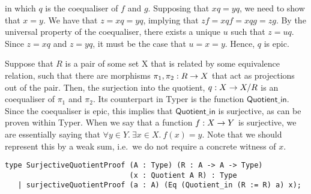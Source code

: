 \documentclass[12pt,twoside,maitrise]{dms}
\theoremstyle{definition}
\numberwithin{equation}{section}
\numberwithin{table}{chapter}
\numberwithin{figure}{chapter}
\newcommand\kw[1] {\textsf{#1}}
\begin{document}
\begin{figure}[H]
\end{figure}

in which $q$ is the coequaliser of $f$ and $g$. Supposing that $xq = yq$, we need to show that $x = y$. We have that $z = xq = yq$, implying that $zf = xqf = xqg = zg$. By the universal property of the coequaliser, there exists a unique $u$ such that $z = uq$. Since $z = xq$ and $z = yq$, it must be the case that $u = x = y$. Hence, $q$ is epic.

Suppose that $R$ is a pair of some set X that is related by some equivalence
relation, such that there are morphisms $\oftype{\pi_1, \pi_2}{R \rightarrow X}$
that act as projections out of the pair. Then, the surjection into the quotient,
$\oftype{q}{X \rightarrow X/R}$ is an coequaliser of $\pi_1$ and $\pi_2$. Its
counterpart in Typer is the function $\kw{Quotient\_in}$. Since the coequaliser
is epic, this implies that $\kw{Quotient\_in}$ is surjective, as can be proven
within Typer. When we say that a function $\oftype{f}{X \rightarrow Y}$ is
surjective, we are essentially saying that $\forall y \in Y. \ \exists x \in X.
\ f(x) = y$. Note that we should represent this by a weak sum, i.e.\ we do not
require a concrete witness of $x$.

\begin{verbatim}
type SurjectiveQuotientProof (A : Type) (R : A -> A -> Type)
                             (x : Quotient A R) : Type
   | surjectiveQuotientProof (a : A) (Eq (Quotient_in (R := R) a) x);
\end{verbatim}
\end{document}
